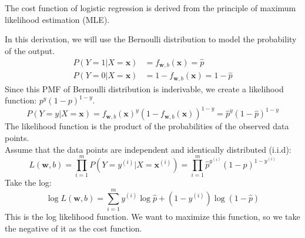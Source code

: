 \begin{notebox}
    \hspace*{2em}The cost function of logistic regression is derived from the principle of maximum likelihood estimation 
    (MLE).

    \hspace*{2em}In this derivation, we will use the Bernoulli distribution to model the probability of the output.
    \begin{align*}
        P(Y=1|X= \mathbf{x}) &= f_{\mathbf{w}, b}(\mathbf{x})= \hat{p}\\
        P(Y=0|X= \mathbf{x}) &= 1 - f_{\mathbf{w}, b}(\mathbf{x}) = 1 - \hat{p}
    \end{align*}
    Since this PMF of Bernoulli distribution is inderivable, we create a likelihood function: $p^y(1-p)^{1-y}$.
    \begin{equation*}
        P(Y=y|X= \mathbf{x}) = f_{\mathbf{w}, b}(\mathbf{x})^y(1 - f_{\mathbf{w}, b}(\mathbf{x}))^{1-y} =\hat{p}^y(1-\hat{p})^{1-y}
    \end{equation*}
    The likelihood function is the product of the probabilities of the observed data points.\\
    Assume that the data points are independent and identically distributed (i.i.d):
    \begin{equation*}
        L(\mathbf{w}, b) = \prod_{i=1}^{m} P(Y=y^{(i)}|X= \mathbf{x}^{(i)}) = \prod_{i=1}^{m} \hat{p}^{y^{(i)}}(1-\hat{p})^{1-y^{(i)}}
    \end{equation*}
    Take the log:
    \begin{equation*}
        \log L(\mathbf{w}, b) = \sum_{i=1}^{m} y^{(i)} \log \hat{p} + (1 - y^{(i)}) \log(1 - \hat{p})
    \end{equation*}
    This is the log likelihood function. We want to maximize this function, so we take the negative of it as the cost function.
\end{notebox}

